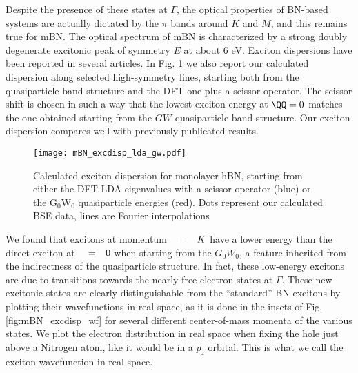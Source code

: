 Despite the presence of these states at $\Gamma$, the optical properties of BN-based systems are actually dictated by the $\pi$ bands around $K$ and $M$, and this remains true for mBN.
The optical spectrum of mBN is characterized by a strong doubly degenerate excitonic peak of symmetry $E$ at about $6$ eV. Exciton dispersions have been reported in several articles.\cite{cudazzo2016exciton,koskelo2017excitons,sponza2018direct} In Fig. \ref{fig:mBN_excdisp_lda_gw} we also report our calculated dispersion along selected high-symmetry lines, starting both from the quasiparticle band structure and the DFT one plus a scissor operator. The scissor shift is chosen in such a way that the lowest exciton energy at $\QQ = 0$ matches the one obtained starting from the $GW$ quasiparticle band structure. Our exciton dispersion compares well with previously publicated results.\cite{koskelo2017excitons,sponza2018direct}

\begin{figure}[h!b]
	\vspace{0.2cm}
	\setcapindent{2em}
	\centering
	\texttt{[image: mBN\_excdisp\_lda\_gw.pdf]}
	\caption{Calculated exciton dispersion for monolayer hBN, starting from either the DFT-LDA eigenvalues with a scissor operator (blue) or the G$_0$W$_0$ quasiparticle energies (red). Dots represent our calculated BSE data, lines are Fourier interpolations}
	\label{fig:mBN_excdisp_lda_gw}
\end{figure}
We found that excitons at momentum $\qq=K$ have a lower energy than the direct exciton at $\qq=0$ when starting from the $G_0W_0$, a feature inherited from the indirectness of the quasiparticle structure. In fact, these low-energy excitons are due to transitions towards the nearly-free electron states at $\Gamma$.
These new excitonic states are clearly distinguishable from the ``standard'' BN excitons by plotting their wavefunctions in real space, as it is done in the insets of Fig. \ref{fig:mBN_excdisp_wf} for several different center-of-mass momenta of the various states. We plot the electron distribution in real space when fixing the hole just above a Nitrogen atom, like it would be in a $p_z$ orbital. This is what we call the exciton wavefunction in real space.

